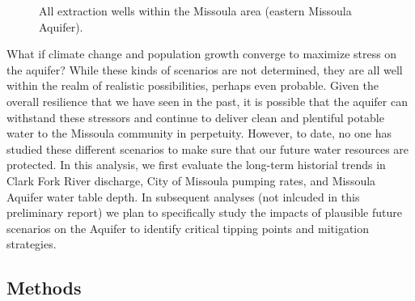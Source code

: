 \documentclass[
  letterpaper,
  DIV=11,
  numbers=noendperiod]{scrartcl}
\begin{document}
\begin{figure}


\caption{\label{fig-extract-map}All extraction wells within the Missoula
area (eastern Missoula Aquifer).}

\end{figure}%

What if climate change and population growth converge to maximize stress
on the aquifer? While these kinds of scenarios are not determined, they
are all well within the realm of realistic possibilities, perhaps even
probable. Given the overall resilience that we have seen in the past, it
is possible that the aquifer can withstand these stressors and continue
to deliver clean and plentiful potable water to the Missoula community
in perpetuity. However, to date, no one has studied these different
scenarios to make sure that our future water resources are protected. In
this analysis, we first evaluate the long-term historial trends in Clark
Fork River discharge, City of Missoula pumping rates, and Missoula
Aquifer water table depth. In subsequent analyses (not inlcuded in this
preliminary report) we plan to specifically study the impacts of
plausible future scenarios on the Aquifer to identify critical tipping
points and mitigation strategies.

\subsection{Methods}\label{methods}
\end{document}
